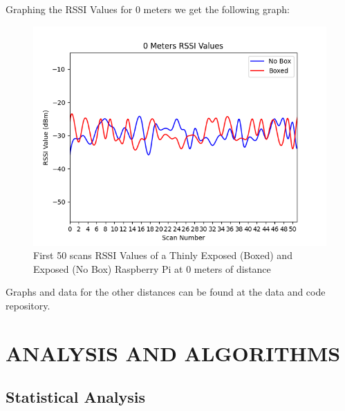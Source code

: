 \documentclass[letterpaper, 10 pt, conference]{ieeeconf}  %
\begin{document}
Graphing the RSSI Values for 0 meters we get the following graph:
   \begin{figure}[thpb]
      \centering
      \includegraphics[scale=0.5]{0Meters.png}
      \caption{First 50 scans RSSI Values of a Thinly Exposed (Boxed) and Exposed (No Box) Raspberry Pi at 0 meters of distance}
      \label{figurelabel}
   \end{figure}

Graphs and data for the other distances can be found at the data and code repository.


\section{ANALYSIS AND ALGORITHMS}
\subsection{Statistical Analysis}
\end{document}
